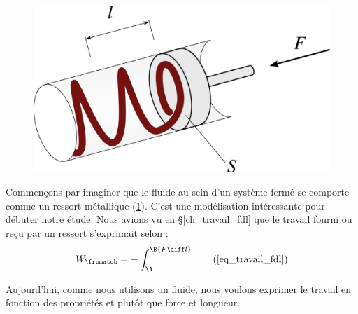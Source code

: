		\begin{figure}
			\begin{center}
				\includegraphics[width=12cm]{images/travail_cylindre_1.png}
			\end{center}
			\label{fig_piston_ressort}
		\end{figure}

		Commençons par imaginer que le fluide au sein d’un système fermé se comporte comme un ressort métallique (\cref{fig_piston_ressort}). C’est une modélisation intéressante pour débuter notre étude. Nous avions vu en \S\ref{ch_travail_fdl} que le travail fourni ou reçu par un ressort s’exprimait selon :
		\begin{equation*}
			W_\fromatob = - \int_\A^\B {F \diff l} \tag{\ref{eq_travail_fdl}}
		\end{equation*}

		Aujourd’hui, comme nous utilisons un fluide, nous voulons exprimer le travail en fonction des propriétés  et  plutôt que force et longueur.

